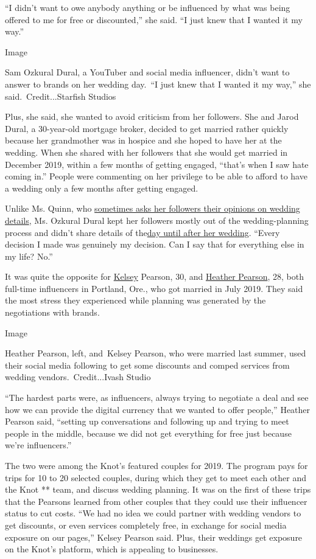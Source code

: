 ``I didn't want to owe anybody anything or be influenced by what was
being offered to me for free or discounted,'' she said. ``I just knew
that I wanted it my way.''

Image

Sam Ozkural Dural, a YouTuber and social media influencer, didn't want
to answer to brands on her wedding day.~``I just knew that I wanted it
my way,'' she said.~Credit...Starfish Studios

Plus, she said, she wanted to avoid criticism from her followers. She
and Jarod Dural, a 30-year-old mortgage broker, decided to get married
rather quickly because her grandmother was in hospice and she hoped to
have her at the wedding. When she shared with her followers that she
would get married in December 2019, within a few months of getting
engaged, ``that's when I saw hate coming in.'' People were commenting on
her privilege to be able to afford to have a wedding only a few months
after getting engaged.

Unlike Ms. Quinn, who
\href{https://www.instagram.com/p/CB4SGvXgKES/}{sometimes asks her
followers their opinions on wedding details}, Ms. Ozkural Dural kept her
followers mostly out of the wedding-planning process and didn't share
details of the\href{https://www.instagram.com/p/B839vhTnveP/}{day until
after her wedding}. ``Every decision I made was genuinely my decision.
Can I say that for everything else in my life? No.''

It was quite the opposite for
\href{https://www.instagram.com/kelseystacypearson/}{Kelsey} Pearson,
30, and \href{https://www.instagram.com/heathermyriahpearson/}{Heather
Pearson}, 28, both full-time influencers in Portland, Ore., who got
married in July 2019. They said the most stress they experienced while
planning was generated by the negotiations with brands.

Image

Heather Pearson, left, and~Kelsey Pearson, who were married last summer,
used their social media following to get some discounts and comped
services from wedding vendors.~Credit...Ivash Studio

``The hardest parts were, as influencers, always trying to negotiate a
deal and see how we can provide the digital currency that we wanted to
offer people,'' Heather Pearson said, ``setting up conversations and
following up and trying to meet people in the middle, because we did not
get everything for free just because we're influencers.''

The two were among the Knot's featured couples for 2019. The program
pays for trips for 10 to 20 selected couples, during which they get to
meet each other and the Knot ** team, and discuss wedding planning. It
was on the first of these trips that the Pearsons learned from other
couples that they could use their influencer status to cut costs. ``We
had no idea we could partner with wedding vendors to get discounts, or
even services completely free, in exchange for social media exposure on
our pages,'' Kelsey Pearson said. Plus, their weddings get exposure on
the Knot's platform, which is appealing to businesses.

